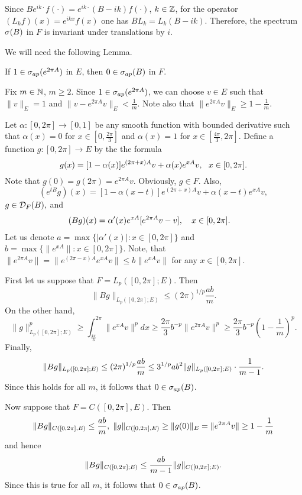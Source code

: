 Since $Be^{ik\cdot} f(\cdot) =e^{ik\cdot} (B-ik)f(\cdot)$,
$k\in{\Bbb{Z}}$, for the operator $(L_kf)(x)=e^{ikx}f(x)$
one has $BL_k=L_k(B-ik)$.
Therefore,
the spectrum
$\sigma (B)$ in $F$
is invariant under translations by $i$.

We will need the following Lemma.

\begin{lem}
If $1 \in \sigma_{ap} (e^{2\pi A})$ in $E$, then $0 \in \sigma_{ap} (B)$ in
$F$.
\end{lem}

\begin{pf}
Fix $m\in{\Bbb{N}}$, $m\geq 2$.  Since $1\in \sigma_{ap} (e^{2\pi A})$,
we can choose $v\in E$ such that $\|v\|_E =1$ and $\|v-e^{2\pi A}v\|_E <
\frac1m$.  Note also that $\|e^{2\pi A} v\|_E\geq 1-\frac1m$.

Let $\alpha: [0,2\pi]\to [0,1]$ be any smooth function with bounded
derivative such that $\alpha (x)=0$ for $x\in [0,\frac{2\pi}{3}]$ and
$\alpha(x)=1$ for $x\in [\frac{4\pi}{3}, 2\pi]$.
Define a function $g: [0,2\pi]\to E$ by the the formula
\begin{equation}
g(x) =[1-\alpha(x)]
e^{(2\pi +x)A} v+\alpha (x) e^{xA}v,~~x\in [0,2\pi].
\lb{2.1}
\end{equation}
Note that $g(0) =g(2\pi) =e^{2 \pi A} v$.  Obviously, $g\in F$.
Also,
$$
(e^{tB} g)(x) = [1-\alpha (x-t)]e^{(2\pi +x)A} v+\alpha (x-t) e^{xA} v,$$
$g\in {\cal{D}}_F(B),$
and
\begin{align}
(Bg) (x) &= \alpha' (x) e^{xA} [e^{2\pi A} v-v], \quad x\in[0,2\pi].
\lb{2.2}
\end{align}
Let us denote  $a=\max \{| \alpha' (x) | : x\in[0,2\pi]\}$ and
$b=\max \{\|e^{xA}\|: x\in [0,2\pi]\}$.
Note, that $\|e^{2\pi A}v\| =\| e^{(2\pi
-x)A} e^{xA} v\| \leq b\|e^{xA}v\|$ for any $x\in [0,2\pi]$.


First let us suppose that $F=L_p ([0,2\pi];E)$.
Then
$$\|Bg\|_{L_p ([0,2\pi];E)}
\leq (2\pi)^{1/p} \frac{ab}{m}.$$
On the other hand,
$$
\|g\|^p_{L_p ([0,2\pi];E)}
\geq \int_{\frac{4\pi}3}^{2\pi} \|e^{xA}v\|^p dx
\geq \dfrac{2\pi}3 b^{-p} \|e^{2\pi A} v\|^p \geq \dfrac{2\pi}{3} b^{-p}
(1-\dfrac1m)^p.
$$
Finally,
\begin{equation}
\|Bg\|_{L_p([0,2\pi];E)} \leq (2\pi)^{1/p}\dfrac{ab}{m} \leq
3^{1/p} ab^2 \|g\|_{L_p ([0,2\pi];E)} \cdot
\dfrac1{m-1}.
\lb{est}
\end{equation}
Since this holds for all $m$, it follows that $0\in \sigma_{ap}(B)$.

Now suppose that $F=C([0,2\pi], E)$. Then
\begin{equation}
\|Bg\|_{C([0,2\pi],E)} \leq \dfrac{ab}{m}, \; \|g\|_{C([0,2\pi],E)} \geq
\|g(0)\|_E =\| e^{2\pi A}v\| \geq 1-\dfrac1m
\lb{bcontest}
\end{equation}
and hence
\begin{equation}
\|Bg\|_{C([0,2\pi];E)} \leq \dfrac{ab}{m-1} \|g\|_{C([0,2\pi];E)}.
\lb{contest}
\end{equation}
Since this is true for all $m$, it follows that
$0\in \sigma_{ap} (B)$.
\end{pf}


